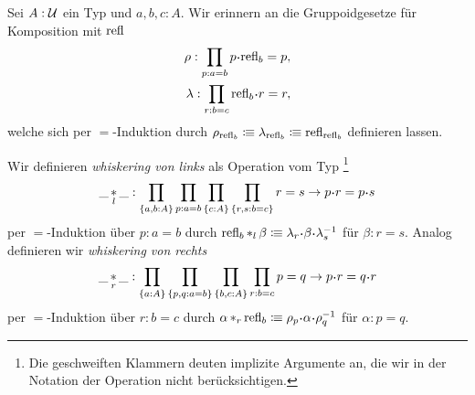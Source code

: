 \documentclass{uebung}
\DeclareMathOperator*{\whisk}{\ast}
\begin{document}
\begin{exercise}
  Sei $A:\mathcal{U}$ ein Typ und $a,b,c:A$.
  Wir erinnern an die Gruppoidgesetze für Komposition mit $\mathrm{refl}$
  \begin{align*}
    \rho:\prod_{p:a=b}p\kon\refl_b = p,\\
    \lambda:\prod_{r:b=c}\refl_b\kon r= r,
  \end{align*}
  welche sich per $=$-Induktion durch $\rho_{\mathrm{refl}_b} \vcentcolon\mspace{-1.2mu}\equiv \lambda_{\mathrm{refl}_b} \vcentcolon\mspace{-1.2mu}\equiv \mathrm{refl}_{\mathrm{refl}_b}$ definieren lassen.

  Wir definieren \emph{whiskering von links} als Operation vom Typ%
  \footnote{Die geschweiften Klammern deuten implizite Argumente an, die wir in der Notation der Operation nicht berücksichtigen.}
  $$
  \_\whisk_l\_:\prod_{\{a,b:A\}}\prod_{p:a=b}\prod_{\{c:A\}}\prod_{\{r,s:b=c\}}r=s\to p\kon r=p\kon s
  $$
  per $=$-Induktion über $p:a=b$ durch $\refl_b\whisk_l\beta \colonequiv\lambda_r\kon\beta\kon\lambda_s^{-1}$ für $\beta:r=s$.
  Analog definieren wir \emph{whiskering von rechts}
  $$
  \_\whisk_r\_:\prod_{\{a:A\}}\prod_{\{p,q:a=b\}}\prod_{\{b,c:A\}}\prod_{r:b=c}p=q\to p\kon r=q\kon r
  $$
  per $=$-Induktion über $r:b=c$ durch $\alpha\whisk_r\refl_b \colonequiv \rho_p\kon\alpha\kon\rho_q^{-1}$ für $\alpha:p=q$.


\end{exercise}
\end{document}
